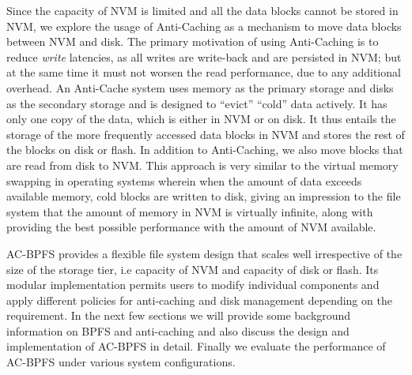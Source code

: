 Since the capacity of NVM is limited and all the data blocks cannot be stored in NVM, we explore the usage of Anti-Caching \cite{c13} as a mechanism to move data blocks between NVM and disk. The primary motivation of using Anti-Caching is to reduce \textit{write} latencies, as all writes are write-back and are persisted in NVM; but at the same time it must not worsen the read performance, due to any additional overhead. An Anti-Cache system uses memory as the primary storage and disks as the secondary storage and is designed to “evict” “cold” data actively. It has only one copy of the data, which is either in NVM or on disk. It thus entails the storage of the more frequently accessed data blocks in NVM and stores the rest of the blocks on disk or flash. In addition to Anti-Caching, we also move blocks that are read from disk to NVM. This approach is very similar to the virtual memory swapping in operating systems wherein when the amount of data exceeds available memory, cold blocks are written to disk, giving an impression to the file system that the amount of memory in NVM is virtually infinite, along with providing the best possible performance with the amount of NVM available.

AC-BPFS provides a flexible file system design that scales well irrespective of the size of the storage tier, i.e capacity of NVM and capacity of disk or flash. Its modular implementation permits users to modify individual components and apply different policies for anti-caching and disk management depending on the requirement. In the next few sections we will provide some background information on BPFS and anti-caching and also discuss the design and implementation of AC-BPFS in detail. Finally we evaluate the performance of AC-BPFS under various system configurations.   


 

